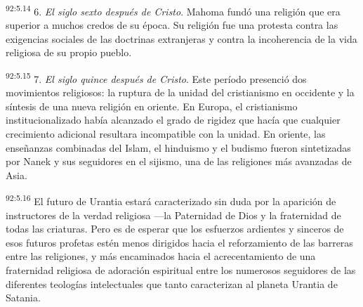 \par
\textsuperscript{92:5.14} 6. \textit{El siglo sexto después de Cristo}. Mahoma fundó una religión que era superior a muchos credos de su época. Su religión fue una protesta contra las exigencias sociales de las doctrinas extranjeras y contra la incoherencia de la vida religiosa de su propio pueblo.

\par
\textsuperscript{92:5.15} 7. \textit{El siglo quince después de Cristo}. Este período presenció dos movimientos religiosos: la ruptura de la unidad del cristianismo en occidente y la síntesis de una nueva religión en oriente. En Europa, el cristianismo institucionalizado había alcanzado el grado de rigidez que hacía que cualquier crecimiento adicional resultara incompatible con la unidad. En oriente, las enseñanzas combinadas del Islam, el hinduismo y el budismo fueron sintetizadas por Nanek y sus seguidores en el sijismo, una de las religiones más avanzadas de Asia.

\par
\textsuperscript{92:5.16} El futuro de Urantia estará caracterizado sin duda por la aparición de instructores de la verdad religiosa ---la Paternidad de Dios y la fraternidad de todas las criaturas. Pero es de esperar que los esfuerzos ardientes y sinceros de esos futuros profetas estén menos dirigidos hacia el reforzamiento de las barreras entre las religiones, y más encaminados hacia el acrecentamiento de una fraternidad religiosa de adoración espiritual entre los numerosos seguidores de las diferentes teologías intelectuales que tanto caracterizan al planeta Urantia de Satania.

